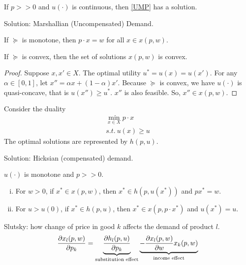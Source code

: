 \documentclass[11pt]{elegantbook}
\begin{document}
\begin{proposition}
    If $p>>0$ and $u(\cdot)$ is continuous, then \ref{UMP} has a solution.
\end{proposition}
Solution: Marshallian (Uncompensated) Demand.

\begin{proposition}
    If $\succeq$ is monotone, then $p\cdot x=w$ for all $x\in x(p,w)$.
\end{proposition}

\begin{proposition}
    If $\succeq$ is convex, then the set of solutions $x(p,w)$ is convex.
\end{proposition}
\begin{proof}
    Suppose $x,x'\in X$. The optimal utility $u^*=u(x)=u(x')$. For any $\alpha\in[0,1]$, let $x''=\alpha x+(1-\alpha)x'$. Because $\succeq$ is convex, we have $u(\cdot)$ is quasi-concave, that is $u(x'')\geq u^*$. $x''$ is also feasible. So, $x''\in x(p,w)$.
\end{proof}

Consider the duality
\begin{equation}
    \begin{aligned}
        \min_{x\in X} p\cdot x\\
        s.t.\ u(x)\geq u
    \end{aligned}
    \tag{EMP}
    \label{EMP}
\end{equation}
The optimal solutions are represented by $h(p,u)$.

Solution: Hicksian (compensated) demand.

\begin{proposition}
    $u(\cdot)$ is monotone and $p>>0$.
    \begin{enumerate}[(i).]
        \item For $w>0$, if $x^*\in x(p,w)$, then $x^*\in h(p,u(x^*))$ and $px^*=w$.
        \item For $u>u(0)$, if $x^*\in h(p,u)$, then $x^*\in x(p,p\cdot x^*)$ and $u(x^*)=u$.
    \end{enumerate}
\end{proposition}

Slutsky: how change of price in good $k$ affects the demand of product $l$.
\begin{equation}
    \begin{aligned}
        \frac{\partial x_l(p,w)}{\partial p_k}=\underbrace{\frac{\partial h_l(p,u)}{\partial p_k}}_{\textnormal{substitution effect}}\underbrace{-\frac{\partial x_l(p,w)}{\partial w} x_k(p,w)}_{\textnormal{income effect}}
    \end{aligned}
    \nonumber
\end{equation}
\end{document}
